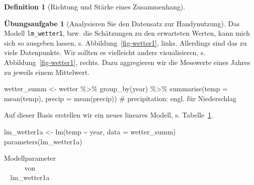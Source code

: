 \documentclass[
  a4paper,
  DIV=11]{scrreprt}
\newenvironment{Shaded}{\begin{snugshade}}{\end{snugshade}}
\newcommand{\AttributeTok}[1]{\textcolor[rgb]{0.40,0.45,0.13}{#1}}
\newcommand{\CommentTok}[1]{\textcolor[rgb]{0.37,0.37,0.37}{#1}}
\newcommand{\FunctionTok}[1]{\textcolor[rgb]{0.28,0.35,0.67}{#1}}
\newcommand{\NormalTok}[1]{\textcolor[rgb]{0.00,0.23,0.31}{#1}}
\newcommand{\OtherTok}[1]{\textcolor[rgb]{0.00,0.23,0.31}{#1}}
\newcommand{\SpecialCharTok}[1]{\textcolor[rgb]{0.37,0.37,0.37}{#1}}
\theoremstyle{definition}
\newtheorem{exercise}{Übungsaufgabe}[chapter]
\theoremstyle{definition}
\theoremstyle{definition}
\newtheorem{definition}{Definition}[chapter]
\theoremstyle{remark}
\begin{document}
\begin{definition}[Richtung und Stärke eines
Zusammenhang]
\begin{exercise}[Analysieren Sie den Datensatz zur
Handynutzung]
Das Modell \texttt{lm\_wetter1}, bzw. die Schätzungen zu den erwarteten
Werten, kann mich sich so ausgeben lassen, s.
Abbildung~\ref{fig-wetter1}, links. Allerdings sind das zu viele
Datenpunkte. Wir sollten es vielleicht anders visualisieren, s.
Abbildung~\ref{fig-wetter1}, rechts. Dazu aggregieren wir die Messwerte
eines Jahres zu jeweils einem Mittelwert.

\begin{Shaded}
\begin{Highlighting}[]
\NormalTok{wetter\_summ }\OtherTok{\textless{}{-}}
\NormalTok{  wetter }\SpecialCharTok{\%\textgreater{}\%} 
  \FunctionTok{group\_by}\NormalTok{(year) }\SpecialCharTok{\%\textgreater{}\%} 
  \FunctionTok{summarise}\NormalTok{(}\AttributeTok{temp =} \FunctionTok{mean}\NormalTok{(temp),}
            \AttributeTok{precip =} \FunctionTok{mean}\NormalTok{(precip))  }\CommentTok{\# precipitation: engl. für Niederschlag}
\end{Highlighting}
\end{Shaded}

Auf dieser Basis erstellen wir ein neues lineares Modell, s.
Tabelle~\ref{tbl-lm-wetter1a}.

\begin{Shaded}
\begin{Highlighting}[]
\NormalTok{lm\_wetter1a }\OtherTok{\textless{}{-}} \FunctionTok{lm}\NormalTok{(temp }\SpecialCharTok{\textasciitilde{}}\NormalTok{ year, }\AttributeTok{data =}\NormalTok{ wetter\_summ)}
\FunctionTok{parameters}\NormalTok{(lm\_wetter1a)}
\end{Highlighting}
\end{Shaded}

\begin{longtable}[]{@{}
  >{\raggedright\arraybackslash}p{}
  >{\centering\arraybackslash}p{}
  >{\centering\arraybackslash}p{}
  >{\centering\arraybackslash}p{}
  >{\centering\arraybackslash}p{}
  >{\centering\arraybackslash}p{}@{}}

\caption{\label{tbl-lm-wetter1a}Modellparameter von lm\_wetter1a}

\tabularnewline


\end{longtable}
\end{exercise}
\end{definition}
\end{document}
